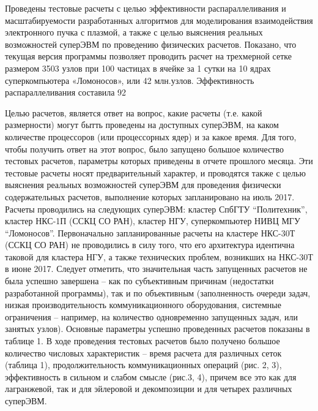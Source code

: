 Проведены тестовые расчеты с целью эффективности распараллеливания и масштабируемости разработанных алгоритмов для моделирования взаимодействия электронного пучка с плазмой, а также с целью выяснения реальных возможностей суперЭВМ по проведению физических расчетов. Показано, что текущая версия программы позволяет проводить расчет на трехмерной сетке размером 3503 узлов при 100 частицах в ячейке за 1 сутки на 10 ядрах суперкомпьютера «Ломоносов», или 42 млн.узлов. Эффективность распараллеливания составила 92 %















Целью расчетов,  является ответ на вопрос, какие расчеты (т.е. какой размерности) могут бытть проведены на доступных суперЭВМ, на каком количестве процессоров (или процессорных ядер) и за какое время. 
Для того, чтобы получить ответ на этот вопрос, было запущено большое количество тестовых расчетов, параметры которых приведены в отчете прошлого месяца. Эти тестовые расчеты носят предварительный характер, и проводятся также с целью выяснения реальных возможностей суперЭВМ для проведения физически содержательных расчетов, выполнение которых запланировано   на июль 2017. 	Расчеты проводились на следующих суперЭВМ: кластер СпбГТУ “Политехник”, кластер НКС-1П (ССКЦ СО РАН), кластер НГУ,  суперкомпьютер НИВЦ МГУ “Ломоносов”. Первоначально запланированные расчеты на кластере НКС-30Т  (ССКЦ СО РАН) не проводились в силу того, что его архитектура идентична таковой для кластера НГУ, а также технических проблем, возникших на НКС-30Т в июне 2017.
Следует отметить, что значительная часть запущенных расчетов не была успешно завершена – как по субъективным причинам (недостатки разработанной программы), так и по объективным (заполненность очереди задач, низкая производительность коммуникационного оборудования, системные ограничения – например, на количество одновременно запущенных задач, или занятых узлов). Основные параметры успешно проведенных расчетов показаны в таблице 1. 
В ходе проведения тестовых расчетов было получено большое количество числовых характеристик – время расчета для различных сеток (таблица 1), продолжительность коммуникационных операций (рис. 2, 3), эффективность в сильном и слабом смысле (рис.3, 4), причем все это как для лагранжевой, так и для эйлеровой и декомпозиции и для четырех различных суперЭВМ. 




